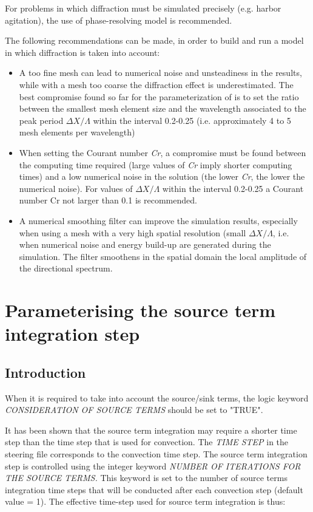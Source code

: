  For problems in which diffraction must be simulated precisely (e.g. harbor agitation), the use of phase-resolving model is recommended.

 The following recommendations can be made, in order to build and run a \tomawac model in which diffraction is taken into account:

\begin{itemize}
\item  A too fine mesh can lead to numerical noise and unsteadiness in the results, while with a mesh too coarse the diffraction
  effect is underestimated. The best compromise found so far for the parameterization of \tomawac is to set the ratio between the
  smallest mesh element size and the wavelength associated to the peak period $\Delta X/\Lambda$ within the interval 0.2-0.25 (i.e.
  approximately 4 to 5 mesh elements per wavelength)

\item  When setting the Courant number \textit{Cr}, a compromise must be found between the computing time required (large values of
  \textit{Cr} imply shorter computing times) and a low numerical noise in the solution (the lower \textit{Cr}, the lower the numerical
  noise). For values of  $\Delta X/\Lambda$ within the interval 0.2-0.25 a Courant number Cr not larger than 0.1 is recommended.

\item  A numerical smoothing filter can improve the simulation results, especially when using a mesh with a very high spatial resolution
  (small $\Delta X/\Lambda$, i.e. when numerical noise and energy build-up are generated during the simulation. The filter smoothens in
  the spatial domain the local amplitude of the directional spectrum.
\end{itemize}


\section{ Parameterising the source term integration step}


\subsection{ Introduction}

When it is required to take into account the source/sink terms, the logic keyword \textit{CONSIDERATION OF SOURCE TERMS }should be set
to "TRUE".

It has been shown that the source term integration may require a shorter time step than the time step that is used for convection. The
\textit{TIME STEP} in the steering file corresponds to the convection time step. The source term integration step is controlled using
the integer keyword \textit{NUMBER OF ITERATIONS FOR THE SOURCE TERMS.} This keyword is set to the number of source terms integration
time steps that will be conducted after each convection step (default value = 1). The effective time-step used for source term
integration is thus:

